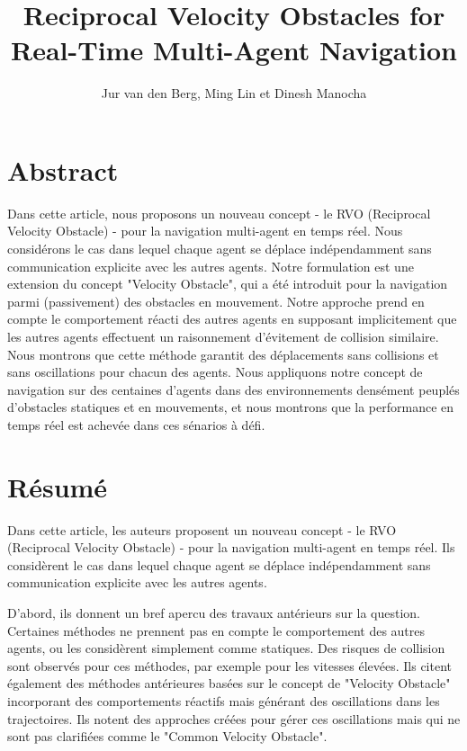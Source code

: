 \documentclass[11pt]{article}
\title{Reciprocal Velocity Obstacles for Real-Time Multi-Agent Navigation}
\author{Jur van den Berg, Ming Lin et Dinesh Manocha}
\date{
	\begin{center}
		University of North Carolina at Chapel Hill, USA. \\
		2008 IEEE International Conference on Robotics and Automation \\
		Pasadena, CA, USA, May 19-23, 2008
	\end{center}
}
\begin{document}
\maketitle

\section*{Abstract}

Dans cette article, nous proposons un nouveau concept - le RVO (Reciprocal Velocity Obstacle) - pour la navigation multi-agent en temps réel. Nous considérons le cas dans lequel chaque agent se déplace indépendamment sans communication explicite avec les autres agents. Notre formulation est une extension du concept "Velocity Obstacle", qui a été introduit pour la navigation parmi (passivement) des obstacles en mouvement. Notre approche prend en compte le comportement réacti des autres agents en supposant implicitement que les autres agents effectuent un raisonnement d'évitement de collision similaire. Nous montrons que cette méthode garantit des déplacements sans collisions et sans oscillations pour chacun des agents. Nous appliquons notre concept de navigation sur des centaines d'agents dans des environnements densément peuplés d'obstacles statiques et en mouvements, et nous montrons que la performance en temps réel est achevée dans ces sénarios à défi.

\section{Résumé}

Dans cette article, les auteurs proposent un nouveau concept - le RVO (Reciprocal Velocity Obstacle) - pour la navigation multi-agent en temps réel. Ils considèrent le cas dans lequel chaque agent se déplace indépendamment sans communication explicite avec les autres agents. 

D'abord, ils donnent un bref apercu des travaux antérieurs sur la question. Certaines méthodes ne prennent pas en compte le comportement des autres agents, ou les considèrent simplement comme statiques. Des risques de collision sont observés pour ces méthodes, par exemple pour les vitesses élevées. Ils citent également des méthodes antérieures basées sur le concept de "Velocity Obstacle" incorporant des comportements réactifs mais générant des oscillations dans les trajectoires. Ils notent des approches créées pour gérer ces oscillations mais qui ne sont pas clarifiées comme le "Common Velocity Obstacle".
\end{document}
